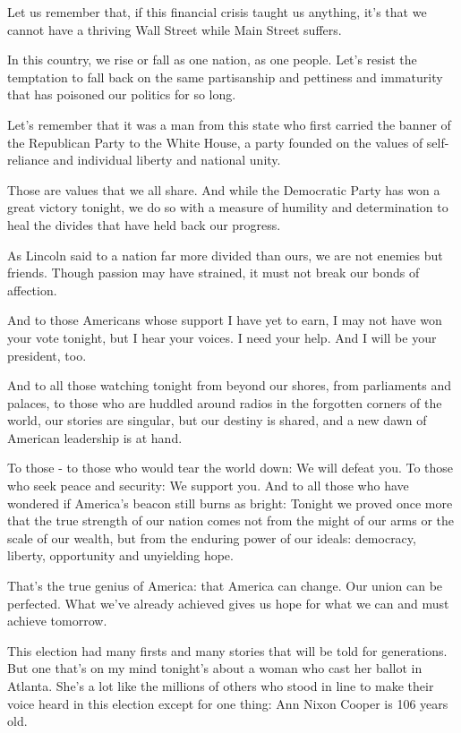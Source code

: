\documentclass[12pt,a4paper,twocolumn]{article}
\begin{document}
Let us remember that, if this financial crisis taught us anything, it's that we cannot have a thriving Wall Street while
Main Street suffers.

In this country, we rise or fall as one nation, as one people. Let's resist the temptation to fall back on the same
partisanship and pettiness and immaturity that has poisoned our politics for so long.

Let's remember that it was a man from this state who first carried the banner of the Republican Party to the White House, a
party founded on the values of self-reliance and individual liberty and national unity.

Those are values that we all share. And while the Democratic Party has won a great victory tonight, we do so with a measure
of humility and determination to heal the divides that have held back our progress.

As Lincoln said to a nation far more divided than ours, we are not enemies but friends. Though passion may have strained, it
must not break our bonds of affection.

And to those Americans whose support I have yet to earn, I may not have won your vote tonight, but I hear your voices. I
need your help. And I will be your president, too.

And to all those watching tonight from beyond our shores, from parliaments and palaces, to those who are huddled around
radios in the forgotten corners of the world, our stories are singular, but our destiny is shared, and a new dawn of
American leadership is at hand.

To those - to those who would tear the world down: We will defeat you. To those who seek peace and security: We support you.
And to all those who have wondered if America's beacon still burns as bright: Tonight we proved once more that the true
strength of our nation comes not from the might of our arms or the scale of our wealth, but from the enduring power of our
ideals: democracy, liberty, opportunity and unyielding hope.

That's the true genius of America: that America can change. Our union can be perfected. What we've already achieved gives us
hope for what we can and must achieve tomorrow.

This election had many firsts and many stories that will be told for generations. But one that's on my mind tonight's about
a woman who cast her ballot in Atlanta. She's a lot like the millions of others who stood in line to make their voice heard
in this election except for one thing: Ann Nixon Cooper is 106 years old.
\end{document}
